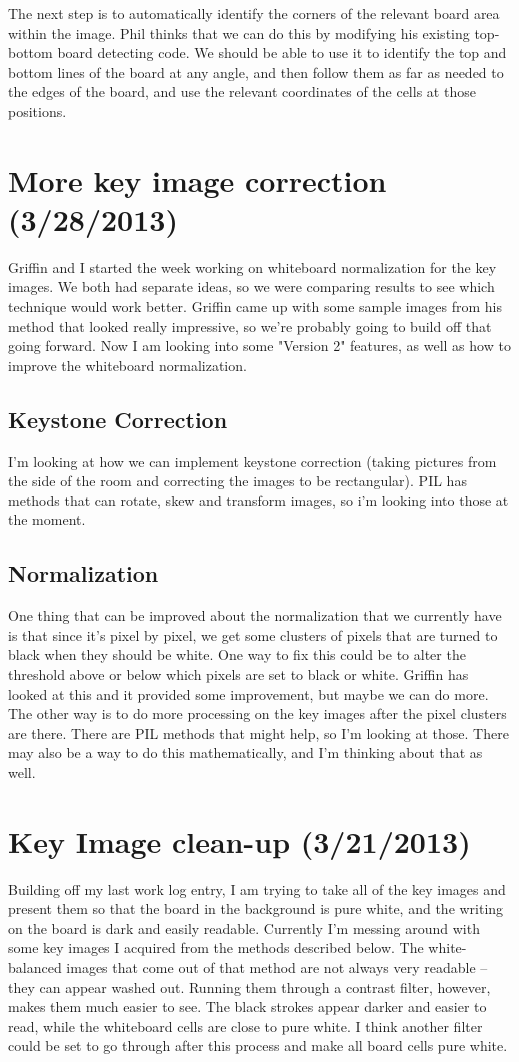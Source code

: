 \documentclass[]{article}
\begin{document}
	The next step is to automatically identify the corners of the relevant board area within the image. Phil thinks that we can do this by modifying his existing top-bottom board detecting code.  We should be able to use it to identify the top and bottom lines of the board at any angle, and then follow them as far as needed to the edges of the board, and use the relevant coordinates of the cells at those positions.
	\section{More key image correction (3/28/2013)}
		Griffin and I started the week working on whiteboard normalization for the key images.  We both had separate ideas, so we were comparing results to see which technique would work better.  Griffin came up with some sample images from his method that looked really impressive, so we're probably going to build off that going forward.  Now I am looking into some "Version 2" features, as well as how to improve the whiteboard normalization.  
	\subsection*{Keystone Correction}	
	I'm looking at how we can implement keystone correction (taking pictures from the side of the room and correcting the images to be rectangular).  PIL has methods that can rotate, skew and transform images, so i'm looking into those at the moment.  
	\subsection*{Normalization}
	One thing that can be improved about the normalization that we currently have is that since it's pixel by pixel, we get some clusters of pixels that are turned to black when they should be white.  One way to fix this could be to alter the threshold above or below which pixels are set to black or white.  Griffin has looked at this and it provided some improvement, but maybe we can do more.  The other way is to do more processing on the key images after the pixel clusters are there.  There are PIL methods that might help, so I'm looking at those.  There may also be a way to do this mathematically, and I'm thinking about that as well.
	
	\section{Key Image clean-up (3/21/2013)}
		Building off my last work log entry, I am trying to take all of the key images and present them so that the board in the background is pure white, and the writing on the board is dark and easily readable.  Currently I'm messing around with some key images I acquired from the methods described below.  The white-balanced images that come out of that method are not always very readable -- they can appear washed out.  Running them through a contrast filter, however, makes them much easier to see.  The black strokes appear darker and easier to read, while the whiteboard cells are close to pure white.  I think another filter could be set to go through after this process and make all board cells pure white.
	
\end{document}
